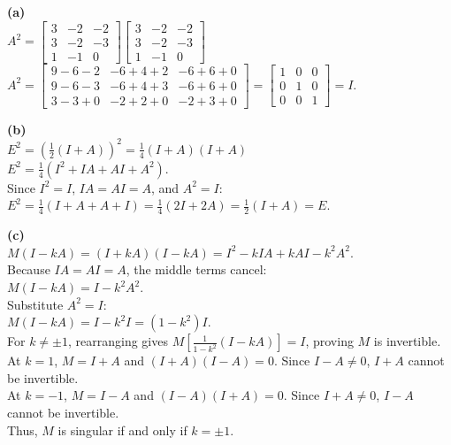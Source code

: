 \begin{solution}
\textbf{(a)} \\
$A^2 = \begin{bmatrix} 3 & -2 & -2 \\ 3 & -2 & -3 \\ 1 & -1 & 0 \end{bmatrix} \begin{bmatrix} 3 & -2 & -2 \\ 3 & -2 & -3 \\ 1 & -1 & 0 \end{bmatrix}$ \\
$A^2 = \begin{bmatrix} 9-6-2 & -6+4+2 & -6+6+0 \\ 9-6-3 & -6+4+3 & -6+6+0 \\ 3-3+0 & -2+2+0 & -2+3+0 \end{bmatrix} = \begin{bmatrix} 1 & 0 & 0 \\ 0 & 1 & 0 \\ 0 & 0 & 1 \end{bmatrix} = I$.

\medskip
\textbf{(b)} \\
$E^2 = \left(\frac{1}{2}(I + A)\right)^2 = \frac{1}{4}(I + A)(I + A)$ \\
$E^2 = \frac{1}{4}(I^2 + IA + AI + A^2)$. \\
Since $I^2 = I$, $IA = AI = A$, and $A^2 = I$: \\
$E^2 = \frac{1}{4}(I + A + A + I) = \frac{1}{4}(2I + 2A) = \frac{1}{2}(I + A) = E$.

\medskip
\textbf{(c)} \\
$M(I - kA) = (I + kA)(I - kA) = I^2 - kIA + kAI - k^2 A^2$. \\
Because $IA = AI = A$, the middle terms cancel: \\
$M(I - kA) = I - k^2 A^2$. \\
Substitute $A^2 = I$: \\
$M(I - kA) = I - k^2 I = (1 - k^2)I$. \\
For $k \neq \pm1$, rearranging gives $M \left[\frac{1}{1-k^2}(I-kA)\right] = I$, proving $M$ is invertible. \\
At $k=1$, $M = I+A$ and $(I+A)(I-A)=0$. Since $I-A \neq 0$, $I+A$ cannot be invertible. \\
At $k=-1$, $M = I-A$ and $(I-A)(I+A)=0$. Since $I+A \neq 0$, $I-A$ cannot be invertible. \\
Thus, $M$ is singular if and only if $k = \pm1$.


\end{solution}
